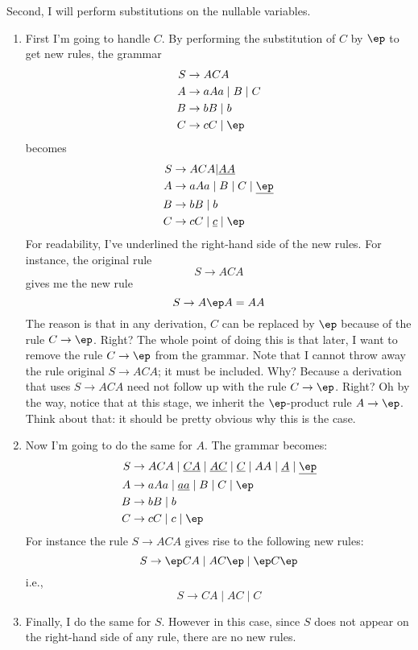 Second, I will perform substitutions on the nullable variables. 
\begin{enumerate}
\item First I'm going to handle $C$.
  By performing the substitution of $C$ by $\ep$ to get
  new rules, the grammar
  \begin{align*}
    S &\rightarrow ACA \\
    A &\rightarrow aAa \mid B \mid C \\
    B &\rightarrow bB \mid b \\
    C &\rightarrow cC \mid \ep
  \end{align*}
  becomes
  \begin{align*}
    S &\rightarrow ACA | \underline{AA} \\
    A &\rightarrow aAa \mid B \mid C \mid \underline{\ep} \\
    B &\rightarrow bB \mid b \\
    C &\rightarrow cC \mid \underline{c} \mid \ep
  \end{align*}
  For readability, I've underlined the right-hand side of the new rules.
  For instance, the original rule 
  \[
  S \rightarrow ACA
  \] 
  gives
  me the new rule 
  \[
  S \rightarrow A\ep A = AA
  \]
  The reason is 
  that in any derivation, 
  $C$ can be replaced by $\ep$ because of the rule $C \rightarrow \ep$.
  Right?
The whole point of doing this is that later, I want to remove the rule
$C \rightarrow \ep$ from the grammar.
Note that I cannot throw away the rule original 
$S \rightarrow ACA$; it must be 
included. 
Why? 
Because a derivation that uses $S \rightarrow ACA$ need not follow up
with the rule $C \rightarrow \ep$. Right?
Oh by the way, notice that at this stage, we inherit the $\ep$-product rule
$A \rightarrow \ep$. Think about that: it should be pretty obvious why this
is the case.

\item Now I'm going to do the same for $A$.
  The grammar becomes:
  \begin{align*}
    S &\rightarrow ACA 
    \mid \underline{CA}
    \mid \underline{AC} 
    \mid \underline{C} 
    \mid AA 
    \mid \underline{A}
    \mid \underline{\ep}
    \\
    A &\rightarrow aAa \mid \underline{aa} \mid B \mid C \mid \ep \\
    B &\rightarrow bB \mid b \\
    C &\rightarrow cC \mid c \mid \ep
  \end{align*}
For instance the rule $S \rightarrow ACA$ gives rise to the following
new rules:
\[
S \rightarrow \ep CA \mid AC \ep \mid \ep C \ep
\]
i.e.,
\[
S \rightarrow CA \mid AC \mid C
\]

\item Finally, I do the same for $S$. However in this case,
since $S$ does not appear on the right-hand side of any 
rule, there are no new rules.
\end{enumerate}

